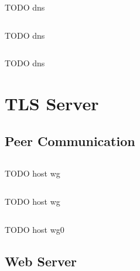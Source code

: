 \blindtext

\begin{listing}[ht]
\inputminted{bash}{snippets/dns.bash}
\caption{TODO dns}
\end{listing}

\blindtext

\begin{listing}[ht]
\inputminted{bash}{snippets/bind}
\caption{TODO dns}
\end{listing}

\blindtext

\begin{listing}[ht]
\inputminted{zone}{snippets/example.zone}
\caption{TODO dns}
\end{listing}

\blindtext











\section{TLS Server}

\blindtext

\subsection{Peer Communication}

\blindtext

\begin{listing}[ht]
\inputminted{bash}{snippets/host_wg.bash}
\caption{TODO host wg}
\end{listing}

\blindtext

\begin{listing}[ht]
\inputminted{ini}{snippets/host_wg.ini}
\caption{TODO host wg}
\end{listing}

\blindtext

\begin{listing}[ht]
\inputminted{ini}{snippets/host_wg0.ini}
\caption{TODO host wg0}
\end{listing}

\blindtext

\subsection{Web Server}

